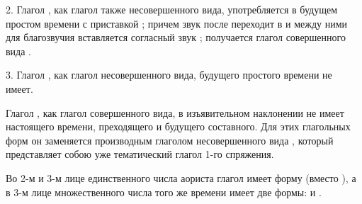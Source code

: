 \documentclass[11pt,a4paper,oneside]{memoir}
\begin{document}
2. Глагол {}, как глагол также несовершенного вида,
употребляется в будущем простом времени с приставкой {};
причем звук {} после {} переходит в {} и между
ними для благозвучия вставляется согласный звук {}; получается
глагол совершенного вида {}.

3. Глагол {}, как глагол несовершенного вида, будущего
простого времени не имеет.

Глагол {}, как глагол совершенного вида, в изъявительном
наклонении не имеет настоящего времени, преходящего и будущего
составного. Для этих глагольных форм он заменяется производным
глаголом несовершенного вида {}, который представляет
собою уже тематический глагол 1-го спряжения.

Во 2-м и 3-м лице единственного числа аориста глагол {}
имеет форму {} (вместо {}), а в 3-м лице
множественного числа того же времени имеет две формы: {} и
{}.
\end{document}
